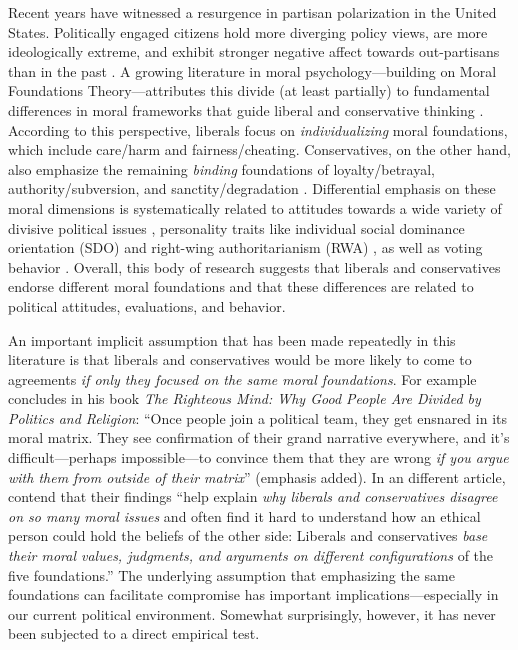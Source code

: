Recent years have witnessed a resurgence in partisan polarization in the United States. Politically engaged citizens hold more diverging policy
views, are more ideologically extreme, and exhibit stronger negative affect towards out-partisans than in the past \citep{hetherington2001resurgent, abramowitz2008polarization, iyengar2012affect, mason2014disrespectfully, huddy2015expressive, iyengar2015fear}. A growing literature in moral psychology---building on Moral Foundations Theory---attributes this divide (at least partially) to fundamental differences in moral frameworks that guide liberal and conservative thinking \citep[c.f.,][]{haidt2012righteous}. According to this perspective, liberals focus on \emph{individualizing} moral foundations, which include care/harm and fairness/cheating. Conservatives, on the other hand, also emphasize the remaining \emph{binding} foundations of loyalty/betrayal, authority/subversion, and sanctity/degradation \citep{haidt2007morality, graham2009liberals}. Differential emphasis on these moral dimensions is systematically related to attitudes towards a wide variety of divisive political issues \citep[e.g.][]{koleva2012tracing, kertzer2014moral, low2015moral}, personality traits like individual social dominance orientation (SDO) and right-wing authoritarianism (RWA) \citep{federico2013mapping}, as well as voting behavior \citep{franks2015using}. Overall, this body of research suggests that liberals and conservatives endorse different moral foundations and that these differences are related to political attitudes, evaluations, and behavior.

An important implicit assumption that has been made repeatedly in this literature is that liberals and conservatives would be more likely to come to agreements \emph{if only they focused on the same moral foundations}. For example \citet[365]{haidt2012righteous} concludes in his book \emph{The Righteous Mind: Why Good People Are Divided by Politics and Religion}: ``Once people join a political team, they get ensnared in its moral matrix. They see confirmation of their grand
narrative everywhere, and it's difficult---perhaps impossible---to convince them that they are wrong \emph{if you argue with them from outside of their matrix}'' (emphasis added). In an different article, \citet[1040]{graham2009liberals} contend that their findings ``help explain \emph{why liberals and conservatives disagree on so many moral issues} and often find it hard to understand how an ethical person could hold the beliefs of the other side: Liberals and conservatives \emph{base their moral values, judgments, and arguments on different configurations} of the five foundations.'' The underlying assumption that emphasizing the same foundations can facilitate compromise has important implications---especially in our current political environment. Somewhat surprisingly, however, it has never been subjected to a direct empirical test.

